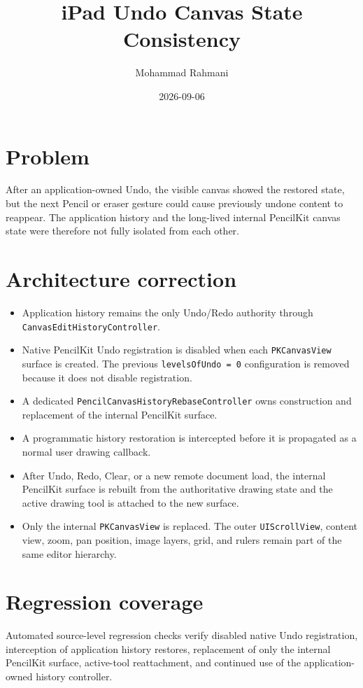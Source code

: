 \documentclass[a4paper]{article}
\title{iPad Undo Canvas State Consistency}
\date{2026-09-06}
\author{Mohammad Rahmani}
\begin{document}
   \maketitle

   \section{Problem}
   After an application-owned Undo, the visible canvas showed the restored state,
   but the next Pencil or eraser gesture could cause previously undone content to
   reappear. The application history and the long-lived internal PencilKit canvas
   state were therefore not fully isolated from each other.

   \section{Architecture correction}
   \begin{itemize}
      \item Application history remains the only Undo/Redo authority through
      \texttt{CanvasEditHistoryController}.
      \item Native PencilKit Undo registration is disabled when each
      \texttt{PKCanvasView} surface is created. The previous
      \texttt{levelsOfUndo = 0} configuration is removed because it does not
      disable registration.
      \item A dedicated \texttt{PencilCanvasHistoryRebaseController} owns
      construction and replacement of the internal PencilKit surface.
      \item A programmatic history restoration is intercepted before it is
      propagated as a normal user drawing callback.
      \item After Undo, Redo, Clear, or a new remote document load, the internal
      PencilKit surface is rebuilt from the authoritative drawing state and the
      active drawing tool is attached to the new surface.
      \item Only the internal \texttt{PKCanvasView} is replaced. The outer
      \texttt{UIScrollView}, content view, zoom, pan position, image layers, grid,
      and rulers remain part of the same editor hierarchy.
   \end{itemize}

   \section{Regression coverage}
   Automated source-level regression checks verify disabled native Undo
   registration, interception of application history restores, replacement of
   only the internal PencilKit surface, active-tool reattachment, and continued
   use of the application-owned history controller.

   
   
\end{document}
